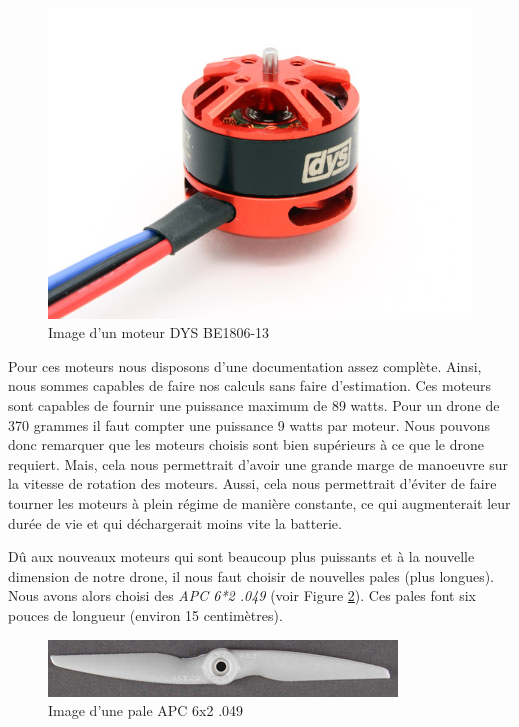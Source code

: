 \documentclass[a4paper,10pt]{report}
\begin{document}
      \begin{figure}[htbp]
	\centering
	\includegraphics[scale = 0.25]{img/dys.jpg}
	\caption{Image d'un moteur DYS BE1806-13}
	\label{dys}
      \end{figure}

      Pour ces moteurs nous disposons d'une documentation assez complète. 
Ainsi, nous sommes capables de faire nos calculs sans faire d'estimation. Ces 
moteurs sont capables de fournir une puissance maximum de 89 watts. Pour un 
drone de 370 grammes il faut compter une puissance 9 watts par moteur. Nous 
pouvons donc remarquer que les moteurs choisis sont bien supérieurs à ce que 
le drone requiert. Mais, cela nous permettrait d'avoir une grande marge de 
manoeuvre sur la vitesse de rotation des moteurs. Aussi, cela nous permettrait 
d'éviter de faire tourner les moteurs à plein régime de manière constante, ce 
qui augmenterait leur durée de vie et qui déchargerait moins vite la batterie.

      Dû aux nouveaux moteurs qui sont beaucoup plus puissants et à la 
nouvelle dimension de notre drone, il nous faut choisir de nouvelles pales 
(plus longues). Nous avons alors choisi des \textit{APC 6*2 .049} (voir Figure 
\ref{pale}). Ces pales font six pouces de longueur (environ 15 centimètres).

      \begin{figure}[htbp]
	\centering
	\includegraphics[scale = 0.4]{img/pale.jpg}
	\caption{Image d'une pale APC 6x2 .049}
	\label{pale}
      \end{figure}
      
\end{document}
